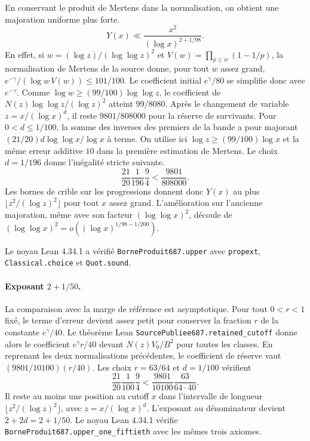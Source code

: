 \documentclass[11pt,a4paper]{article}
\begin{document}
En conservant le produit de Mertens dans la normalisation, on obtient
une majoration uniforme plus forte.
\[
 Y(x)\ll \frac{x^2}{(\log x)^{2+1/98}}.
\]
En effet, si $w=(\log z)/(\log\log z)^2$ et
$V(w)=\prod_{p\le w}(1-1/p)$, la normalisation de Mertens de la source
donne, pour tout $w$ assez grand,
$e^{-\gamma}/(\log w\, V(w))\le101/100$.
Le coefficient initial $e^\gamma/80$ se simplifie donc avec
$e^{-\gamma}$. Comme $\log w\ge(99/100)\log\log z$, le coefficient de
$N(z)\log\log z/(\log z)^2$ atteint $99/8080$.
Après le changement de variable $z=x/(\log x)^d$, il reste
$9801/808000$ pour la réserve de survivants. Pour $0<d\le1/100$, la
somme des inverses des premiers de la bande a pour majorant
$(21/20)d\log\log x/\log x$ à terme. On utilise ici
$\log z\ge(99/100)\log x$ et la même erreur additive $10$
dans la première estimation de Mertens. Le choix $d=1/196$ donne l’inégalité stricte suivante.
\[
 \frac{21}{20}\frac{1}{196}\frac94 < \frac{9801}{808000}.
\]
Les bornes de crible sur les progressions donnent donc $Y(x)$ au plus
$\lfloor z^2/(\log z)^2\rfloor$ pour tout $x$ assez grand.
L'amélioration sur l'ancienne majoration, même avec son facteur
$(\log\log x)^2$, découle de
$(\log\log x)^2=o((\log x)^{1/98-1/200})$.

Le noyau Lean 4.34.1 a vérifié \texttt{BorneProduit687.upper} avec
\texttt{propext}, \texttt{Classical.choice} et \texttt{Quot.sound}.

\paragraph{Exposant $2+1/50$.}
La comparaison avec la marge de référence est asymptotique. Pour tout
$0<r<1$ fixé, le terme d'erreur devient assez petit pour conserver
la fraction $r$ de la constante $e^\gamma/40$. Le théorème Lean
\texttt{SourcePubliee687.retained\_cutoff} donne alors le coefficient
$e^\gamma r/40$ devant $N(z)V_0/B^2$ pour toutes les classes.
En reprenant les deux normalisations précédentes, le coefficient de
réserve vaut $(9801/10100)(r/40)$. Les choix $r=63/64$ et $d=1/100$
vérifient
\[
   \frac{21}{20}\frac{1}{100}\frac94
        <\frac{9801}{10100}\frac{63}{64\cdot40}.
\]
Il reste au moins une position au cutoff $x$ dans l'intervalle de
longueur $\lfloor z^2/(\log z)^2\rfloor$, avec $z=x/(\log x)^d$.
L'exposant au dénominateur devient $2+2d=2+1/50$. Le noyau Lean
4.34.1 vérifie \texttt{BorneProduit687.upper\_one\_fiftieth} avec les
mêmes trois axiomes.
\end{document}
